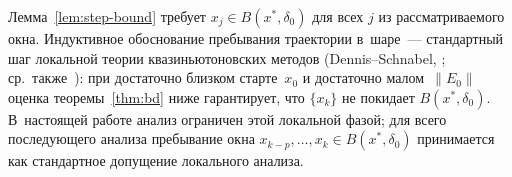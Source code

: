 \begin{remark}
\label{rem:trajectory-confinement}
Лемма~\ref{lem:step-bound} требует $x_j \in B(x^*,\delta_0)$ для всех
$j$ из рассматриваемого окна. Индуктивное обоснование пребывания
траектории в~шаре~--- стандартный шаг локальной теории
квазиньютоновских методов (Dennis--Schnabel,
\cite[Th.~8.2.1]{dennis1996}; ср.~также~\cite[\S 6.4]{bfgs}): при
достаточно близком старте~$x_0$ и достаточно малом~$\|E_0\|$ оценка
теоремы~\ref{thm:bd} ниже гарантирует, что $\{x_k\}$ не покидает
$B(x^*,\delta_0)$. В~настоящей работе анализ ограничен этой локальной
фазой; для всего последующего анализа пребывание окна
$x_{k-p},\ldots,x_k\in B(x^*,\delta_0)$ принимается как стандартное
допущение локального анализа.
\end{remark}


